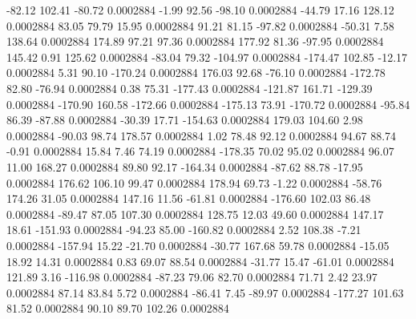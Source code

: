       -82.12      102.41      -80.72     0.0002884
       -1.99       92.56      -98.10     0.0002884
      -44.79       17.16      128.12     0.0002884
       83.05       79.79       15.95     0.0002884
       91.21       81.15      -97.82     0.0002884
      -50.31        7.58      138.64     0.0002884
      174.89       97.21       97.36     0.0002884
      177.92       81.36      -97.95     0.0002884
      145.42        0.91      125.62     0.0002884
      -83.04       79.32     -104.97     0.0002884
     -174.47      102.85      -12.17     0.0002884
        5.31       90.10     -170.24     0.0002884
      176.03       92.68      -76.10     0.0002884
     -172.78       82.80      -76.94     0.0002884
        0.38       75.31     -177.43     0.0002884
     -121.87      161.71     -129.39     0.0002884
     -170.90      160.58     -172.66     0.0002884
     -175.13       73.91     -170.72     0.0002884
      -95.84       86.39      -87.88     0.0002884
      -30.39       17.71     -154.63     0.0002884
      179.03      104.60        2.98     0.0002884
      -90.03       98.74      178.57     0.0002884
        1.02       78.48       92.12     0.0002884
       94.67       88.74       -0.91     0.0002884
       15.84        7.46       74.19     0.0002884
     -178.35       70.02       95.02     0.0002884
       96.07       11.00      168.27     0.0002884
       89.80       92.17     -164.34     0.0002884
      -87.62       88.78      -17.95     0.0002884
      176.62      106.10       99.47     0.0002884
      178.94       69.73       -1.22     0.0002884
      -58.76      174.26       31.05     0.0002884
      147.16       11.56      -61.81     0.0002884
     -176.60      102.03       86.48     0.0002884
      -89.47       87.05      107.30     0.0002884
      128.75       12.03       49.60     0.0002884
      147.17       18.61     -151.93     0.0002884
      -94.23       85.00     -160.82     0.0002884
        2.52      108.38       -7.21     0.0002884
     -157.94       15.22      -21.70     0.0002884
      -30.77      167.68       59.78     0.0002884
      -15.05       18.92       14.31     0.0002884
        0.83       69.07       88.54     0.0002884
      -31.77       15.47      -61.01     0.0002884
      121.89        3.16     -116.98     0.0002884
      -87.23       79.06       82.70     0.0002884
       71.71        2.42       23.97     0.0002884
       87.14       83.84        5.72     0.0002884
      -86.41        7.45      -89.97     0.0002884
     -177.27      101.63       81.52     0.0002884
       90.10       89.70      102.26     0.0002884
